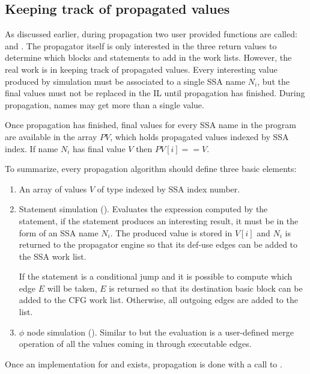 \subsection{Keeping track of propagated values}

As discussed earlier, during propagation two user provided
functions are called:  and
.  The propagator itself is only
interested in the three return values to determine which blocks
and statements to add in the work lists.  However, the real work
is in keeping track of propagated values.  Every interesting
value produced by simulation must be associated to a single SSA
name $N_i$, but the final values must not be replaced in the IL
until propagation has finished.  During propagation, names may
get more than a single value.

Once propagation has finished, final values for every SSA name in
the program are available in the array $PV$, which holds propagated
values indexed by SSA index.  If name $N_i$ has final value $V$
then $PV[i] == V$.


To summarize, every propagation algorithm should define three
basic elements:

\begin{enumerate}
\item	An array of values $V$ of type 
	indexed by SSA index number.

\item	Statement simulation ().
	Evaluates the expression computed by the statement, if
	the statement produces an interesting result, it must be
	in the form of an SSA name $N_i$.  The produced value is
	stored in $V[i]$ and $N_i$ is returned to the propagator
	engine so that its def-use edges can be added to the SSA
	work list.

	If the statement is a conditional jump and it is possible
	to compute which edge $E$ will be taken, $E$ is returned
	so that its destination basic block can be added to the
	CFG work list.  Otherwise, all outgoing edges are added
	to the list.

\item	$\phi$ node simulation ().
	Similar to  but the
	evaluation is a user-defined merge operation of all the
	values coming in through executable edges.
\end{enumerate}

Once an implementation for  and
 exists, propagation is done with a
call to .

